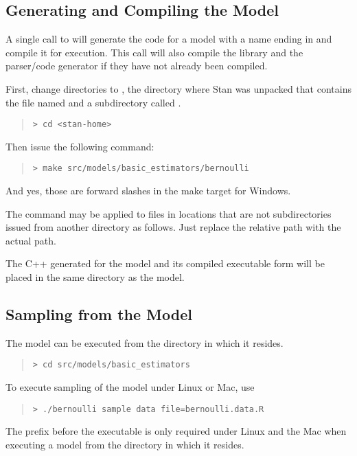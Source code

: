 \subsection{Generating and Compiling the Model}

A single call to  will generate the \Cpp code for a
model with a name ending in  and compile it for
execution.  This call will also compile the library 
and the parser/code generator  if they have not already
been compiled.

First, change directories to , the directory where
Stan was unpacked that contains the file named  and
a subdirectory called .
%
\begin{quote}
\begin{Verbatim}[fontshape=sl]
> cd <stan-home>
\end{Verbatim}
\end{quote}
%
Then issue the following command:
%
\begin{quote}
\begin{Verbatim}[fontshape=sl]
> make src/models/basic_estimators/bernoulli 
\end{Verbatim}
\end{quote}
And yes, those are forward slashes in the make target for Windows.

The  command may be applied to files in locations
that are not subdirectories issued from another directory as follows.
Just replace the relative path  with the
actual path.

The C++ generated for the model and its compiled executable
form will be placed in the same directory as the model.


\subsection{Sampling from the Model}

The model can be executed from the directory in which it resides.
%
\begin{quote}
\begin{Verbatim}[fontshape=sl]
> cd src/models/basic_estimators 
\end{Verbatim}
\end{quote}
%
To execute sampling of the model under Linux or Mac, use
%
\begin{quote}
\begin{Verbatim}[fontshape=sl]
> ./bernoulli sample data file=bernoulli.data.R
\end{Verbatim}
\end{quote}
%
The  prefix before the executable is only required under
Linux and the Mac when executing a model from the directory in which
it resides.

